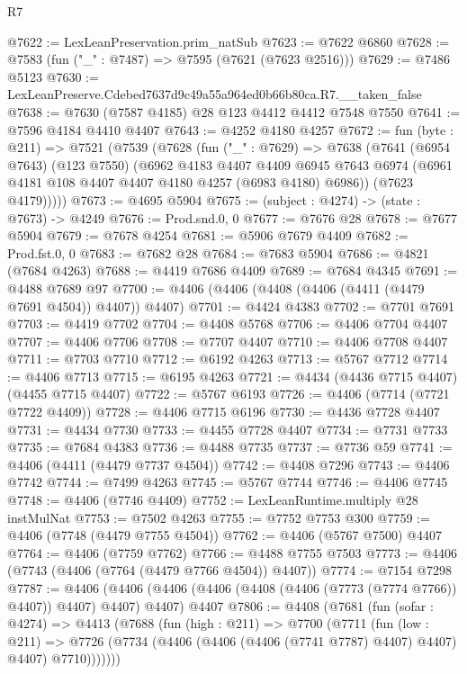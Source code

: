 \begin{lexlean}{R7}
\begin{coremodule}
@7622 := LexLeanPreservation.prim_natSub
@7623 := @7622 @6860
@7628 := @7583 (fun ("_" : @7487) => @7595 (@7621 (@7623 @2516)))
@7629 := @7486 @5123
@7630 := LexLeanPreserve.Cdebed7637d9c49a55a964ed0b66b80ca.R7.__taken_false
@7638 := @7630 (@7587 @4185) @28 @123 @4412 @4412 @7548 @7550
@7641 := @7596 @4184 @4410 @4407
@7643 := @4252 @4180 @4257
@7672 := fun (byte : @211) =>
  @7521
    (@7539
      (@7628
        (fun ("_" : @7629) =>
        @7638
          (@7641
            (@6954 @7643)
            (@123 @7550)
            (@6962
              @4183
              @4407
              @4409
              @6945
              @7643
              @6974
              (@6961 @4181 @108 @4407 @4407 @4180 @4257 (@6983 @4180) @6986))
            (@7623 @4179)))))
@7673 := @4695 @5904
@7675 := (subject : @4274) -> (state : @7673) -> @4249
@7676 := Prod.snd.{0, 0}
@7677 := @7676 @28
@7678 := @7677 @5904
@7679 := @7678 @4254
@7681 := @5906 @7679 @4409
@7682 := Prod.fst.{0, 0}
@7683 := @7682 @28
@7684 := @7683 @5904
@7686 := @4821 (@7684 @4263)
@7688 := @4419 @7686 @4409
@7689 := @7684 @4345
@7691 := @4488 @7689 @97
@7700 := @4406 (@4406 (@4408 (@4406 (@4411 (@4479 @7691 @4504)) @4407)) @4407)
@7701 := @4424 @4383
@7702 := @7701 @7691
@7703 := @4419 @7702
@7704 := @4408 @5768
@7706 := @4406 @7704 @4407
@7707 := @4406 @7706
@7708 := @7707 @4407
@7710 := @4406 @7708 @4407
@7711 := @7703 @7710
@7712 := @6192 @4263
@7713 := @5767 @7712
@7714 := @4406 @7713
@7715 := @6195 @4263
@7721 := @4434 (@4436 @7715 @4407) (@4455 @7715 @4407)
@7722 := @5767 @6193
@7726 := @4406 (@7714 (@7721 @7722 @4409))
@7728 := @4406 @7715 @6196
@7730 := @4436 @7728 @4407
@7731 := @4434 @7730
@7733 := @4455 @7728 @4407
@7734 := @7731 @7733
@7735 := @7684 @4383
@7736 := @4488 @7735
@7737 := @7736 @59
@7741 := @4406 (@4411 (@4479 @7737 @4504))
@7742 := @4408 @7296
@7743 := @4406 @7742
@7744 := @7499 @4263
@7745 := @5767 @7744
@7746 := @4406 @7745
@7748 := @4406 (@7746 @4409)
@7752 := LexLeanRuntime.multiply @28 instMulNat
@7753 := @7502 @4263
@7755 := @7752 @7753 @300
@7759 := @4406 (@7748 (@4479 @7755 @4504))
@7762 := @4406 (@5767 @7500) @4407
@7764 := @4406 (@7759 @7762)
@7766 := @4488 @7755 @7503
@7773 := @4406 (@7743 (@4406 (@7764 (@4479 @7766 @4504)) @4407))
@7774 := @7154 @7298
@7787 := @4406
    (@4406 (@4406 (@4406 (@4408 (@4406 (@7773 (@7774 @7766)) @4407)) @4407) @4407) @4407)
    @4407
@7806 := @4408
    (@7681
      (fun (sofar : @4274) =>
      @4413
        (@7688
          (fun (high : @211) =>
          @7700
            (@7711
              (fun (low : @211) =>
              @7726 (@7734 (@4406 (@4406 (@4406 (@7741 @7787) @4407) @4407) @4407) @7710)))))))

\end{coremodule}
\end{lexlean}
